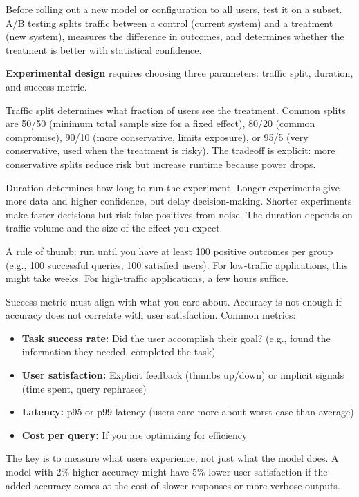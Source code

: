 Before rolling out a new model or configuration to all users, test it on a subset. A/B testing splits traffic between a control (current system) and a treatment (new system), measures the difference in outcomes, and determines whether the treatment is better with statistical confidence.

\textbf{Experimental design} requires choosing three parameters: traffic split, duration, and success metric.

Traffic split determines what fraction of users see the treatment. Common splits are 50/50 (minimum total sample size for a fixed effect), 80/20 (common compromise), 90/10 (more conservative, limits exposure), or 95/5 (very conservative, used when the treatment is risky). The tradeoff is explicit: more conservative splits reduce risk but increase runtime because power drops.

Duration determines how long to run the experiment. Longer experiments give more data and higher confidence, but delay decision-making. Shorter experiments make faster decisions but risk false positives from noise. The duration depends on traffic volume and the size of the effect you expect.

A rule of thumb: run until you have at least 100 positive outcomes per group (e.g., 100 successful queries, 100 satisfied users). For low-traffic applications, this might take weeks. For high-traffic applications, a few hours suffice.

Success metric must align with what you care about. Accuracy is not enough if accuracy does not correlate with user satisfaction. Common metrics:

\begin{itemize}
\item \textbf{Task success rate:} Did the user accomplish their goal? (e.g., found the information they needed, completed the task)
\item \textbf{User satisfaction:} Explicit feedback (thumbs up/down) or implicit signals (time spent, query rephrases)
\item \textbf{Latency:} p95 or p99 latency (users care more about worst-case than average)
\item \textbf{Cost per query:} If you are optimizing for efficiency
\end{itemize}

The key is to measure what users experience, not just what the model does. A model with 2\% higher accuracy might have 5\% lower user satisfaction if the added accuracy comes at the cost of slower responses or more verbose outputs.

